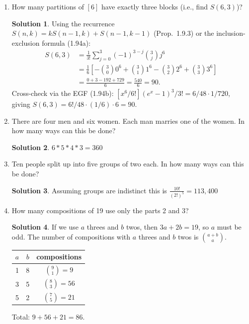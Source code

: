 \documentclass[11pt]{article}
\theoremstyle{definition}
\newtheorem*{solution}{Solution}
\begin{document}
\begin{enumerate}[label=(\alph*)]
  \item How many partitions of $[6]$ have exactly three blocks (i.e., find $S(6,3)$)?
    \begin{solution}
    Using the recurrence $S(n,k) = kS(n-1,k) + S(n-1,k-1)$ (Prop.\ 1.9.3) or the
    inclusion-exclusion formula (1.94a):
    \begin{align*}
      S(6,3) &= \frac{1}{3!}\sum_{j=0}^{3}(-1)^{3-j}\binom{3}{j}j^6 \\
             &= \frac{1}{6}\left[-\binom{3}{0}0^6 + \binom{3}{1}1^6
                - \binom{3}{2}2^6 + \binom{3}{3}3^6\right] \\
             &= \frac{0 + 3 - 192 + 729}{6} = \frac{540}{6} = 90.
    \end{align*}
    Cross-check via the EGF (1.94b): $[x^6/6!](e^x-1)^3/3! = 6/48 \cdot 1/720$,
    giving $S(6,3) = 6!/48 \cdot (1/6) \cdot 6 = 90$. \checkmark
    \end{solution}


  \item There are four men and six women. Each man marries one of the women. In how
    many ways can this be done?
    \begin{solution}
    $6*5*4*3 =360$
    \end{solution}

  \item Ten people split up into five groups of two each. In how many ways can this be done?
    \begin{solution}
    Assuming groups are indistinct this is $\frac{10!}{ (2!)^5} =113,400 $
    \end{solution}

  \item How many compositions of 19 use only the parts 2 and 3?
    \begin{solution}
    If we use $a$ threes and $b$ twos, then $3a+2b=19$, so $a$ must be odd.
    The number of compositions with $a$ threes and $b$ twos is $\binom{a+b}{a}$.
    \begin{center}
    \begin{tabular}{ccc}
      $a$ & $b$ & compositions \\ \hline
      1 & 8 & $\binom{9}{1} = 9$ \\
      3 & 5 & $\binom{8}{3} = 56$ \\
      5 & 2 & $\binom{7}{5} = 21$
    \end{tabular}
    \end{center}
    Total: $9 + 56 + 21 = 86$.
    \end{solution}


\end{enumerate}
\end{document}
